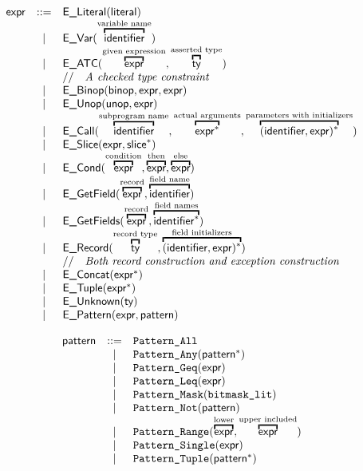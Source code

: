 \documentclass{book}
\begin{document}
\[
\begin{array}{rcl}
\expr &::=& \ELiteral(\literal) \\
	&|& \EVar(\overtext{\identifier}{variable name}) \\
	&|& \EATC(\overtext{\expr}{given expression}, \overtext{\ty}{asserted type}) \\
  & & \ASTComment{A checked type constraint}\\
	&|& \EBinop(\binop, \expr, \expr) \\
	&|& \EUnop(\unop, \expr) \\
	&|& \ECall(\overtext{\identifier}{subprogram name}, \overtext{\expr^{*}}{actual arguments}, \overtext{(\identifier, \expr)^{*}}{parameters with initializers}) \\
	&|& \ESlice(\expr, \slice^{*}) \\
	&|& \ECond(\overtext{\expr}{condition}, \overtext{\expr}{then}, \overtext{\expr}{else}) \\
	&|& \EGetField(\overtext{\expr}{record}, \overtext{\identifier}{field name}) \\
	&|& \EGetFields(\overtext{\expr}{record}, \overtext{\identifier^{*}}{field names}) \\
	&|& \ERecord(\overtext{\ty}{record type}, \overtext{(\identifier, \expr)^{*}}{field initializers})\\
    & & \ASTComment{Both record construction and exception construction}\\
	&|& \EConcat(\expr^{*}) \\
	&|& \ETuple(\expr^{*}) \\
	&|& \EUnknown(\ty) \\
	&|& \EPattern(\expr, \pattern)
\end{array}
\]

\[
\begin{array}{rcl}
\pattern &::=& \texttt{Pattern\_All} \\
  &|& \texttt{Pattern\_Any}(\pattern^{*}) \\
  &|& \texttt{Pattern\_Geq}(\expr) \\
  &|& \texttt{Pattern\_Leq}(\expr) \\
  &|& \texttt{Pattern\_Mask}(\texttt{bitmask\_lit}) \\
  &|& \texttt{Pattern\_Not}(\pattern) \\
  &|& \texttt{Pattern\_Range}(\overtext{\expr}{lower}, \overtext{\expr}{upper included})\\
  &|& \texttt{Pattern\_Single}(\expr) \\
  &|& \texttt{Pattern\_Tuple}(\pattern^{*}) \\
\end{array}
\]
\end{document}
